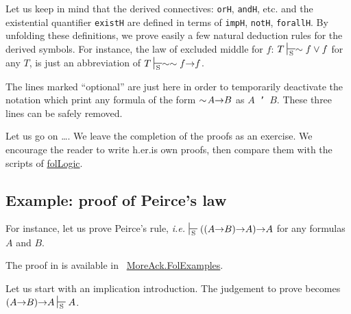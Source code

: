 Let us keep in mind that the derived connectives: \texttt{orH}, \texttt{andH}, etc. and the existential quantifier \texttt{existH}  are defined
in terms of \texttt{impH}, \texttt{notH}, \texttt{forallH}.
By unfolding these definitions, we prove easily a few natural deduction rules for the derived symbols. 
For instance, the law of excluded middle for $f$: $ T\sdash \sim f \vee f$
for any $T$,  is just an abbreviation of $T \sdash \sim\sim{}f \arrow f$.



\begin{remark}
  The lines marked ``optional'' are just here in order to
temporarily deactivate the notation which print any formula 
of the form $\sim{}\!A \mbox{$\rightarrow$} B$ as \texttt{$A$ \disj' $B$}.
 These three lines can be safely removed.
\end{remark}


Let us go on \dots. We leave the completion of the proofs as an exercise. We encourage the reader to write h.er.is own proofs, then compare them with the scripts of \href{../theories/html/hydras.Ackermann.folLogic.html}{folLogic}.












\subsection{Example: proof of Peirce's law}

For instance, let us prove Peirce's rule, \emph{i.e.}
$\sdash ((A \arrow B) \arrow A) \arrow A$ for any formulas $A$ and $B$.

 The proof in \coq is available in  ~\href{../theories/html/hydras.MoreAck.FolExamples.html}{MoreAck.FolExamples}.


Let us start with  an implication introduction. The judgement to prove becomes  $(A \arrow B) \arrow A \sdash A$.

